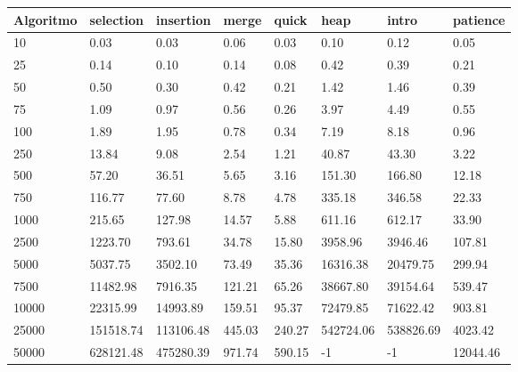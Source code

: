 \documentclass[a4paper,12pt]{scrartcl}
\begin{document}
\begin{table}[]
\begin{tabular}{|l|l|l|l|l|l|l|l|}
\hline
\textbf{Algoritmo} & selection & insertion & merge & quick & heap  & intro & patience  \\ \hline
10                 & 0.03          & 0.03          & 0.06      & 0.03      & 0.10      & 0.12      & 0.05      \\ \hline
25                 & 0.14          & 0.10          & 0.14      & 0.08      & 0.42      & 0.39      & 0.21      \\ \hline
50                 & 0.50          & 0.30          & 0.42      & 0.21      & 1.42      & 1.46      & 0.39      \\ \hline
75                 & 1.09          & 0.97          & 0.56      & 0.26      & 3.97      & 4.49      & 0.55      \\ \hline
100                & 1.89          & 1.95          & 0.78      & 0.34      & 7.19      & 8.18      & 0.96      \\ \hline
250                & 13.84         & 9.08          & 2.54      & 1.21      & 40.87     & 43.30     & 3.22      \\ \hline
500                & 57.20         & 36.51         & 5.65      & 3.16      & 151.30    & 166.80    & 12.18     \\ \hline
750                & 116.77        & 77.60         & 8.78      & 4.78      & 335.18    & 346.58    & 22.33     \\ \hline
1000               & 215.65        & 127.98        & 14.57     & 5.88      & 611.16    & 612.17    & 33.90     \\ \hline
2500               & 1223.70       & 793.61        & 34.78     & 15.80     & 3958.96   & 3946.46   & 107.81    \\ \hline
5000               & 5037.75       & 3502.10       & 73.49     & 35.36     & 16316.38  & 20479.75  & 299.94    \\ \hline
7500               & 11482.98      & 7916.35       & 121.21    & 65.26     & 38667.80  & 39154.64  & 539.47    \\ \hline
10000              & 22315.99      & 14993.89      & 159.51    & 95.37     & 72479.85  & 71622.42  & 903.81    \\ \hline
25000              & 151518.74     & 113106.48     & 445.03    & 240.27    & 542724.06 & 538826.69 & 4023.42   \\ \hline
50000              & 628121.48     & 475280.39     & 971.74    & 590.15    & -1        & -1        & 12044.46  \\ \hline

\end{tabular}
\end{table}
\end{document}
